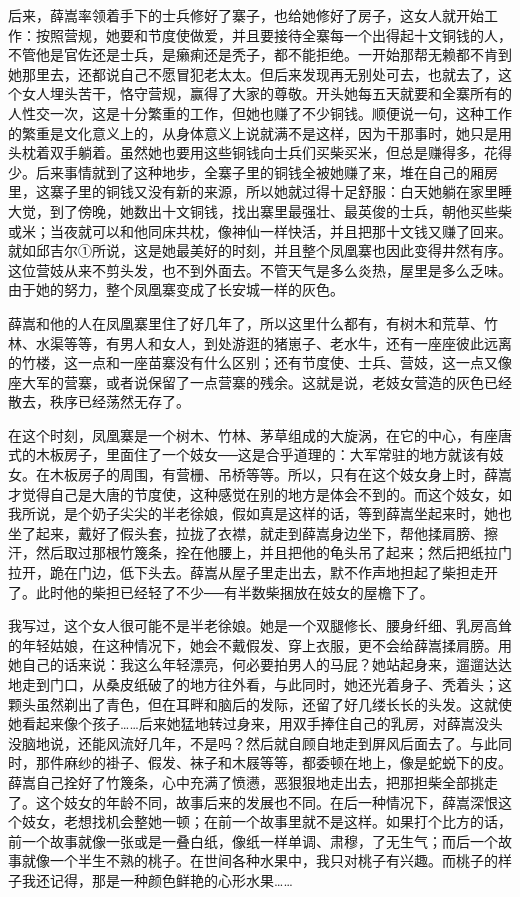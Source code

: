后来，薛嵩率领着手下的士兵修好了寨子，也给她修好了房子，这女人就开始工作：按照营规，她要和节度使做爱，并且要接待全寨每一个出得起十文铜钱的人，不管他是官佐还是士兵，是癞痢还是秃子，都不能拒绝。一开始那帮无赖都不肯到她那里去，还都说自己不愿冒犯老太太。但后来发现再无别处可去，也就去了，这个女人埋头苦干，恪守营规，赢得了大家的尊敬。开头她每五天就要和全寨所有的人性交一次，这是十分繁重的工作，但她也赚了不少铜钱。顺便说一句，这种工作的繁重是文化意义上的，从身体意义上说就满不是这样，因为干那事时，她只是用头枕着双手躺着。虽然她也要用这些铜钱向士兵们买柴买米，但总是赚得多，花得少。后来事情就到了这种地步，全寨子里的铜钱全被她赚了来，堆在自己的厢房里，这寨子里的铜钱又没有新的来源，所以她就过得十足舒服：白天她躺在家里睡大觉，到了傍晚，她数出十文铜钱，找出寨里最强壮、最英俊的士兵，朝他买些柴或米；当夜就可以和他同床共枕，像神仙一样快活，并且把那十文钱又赚了回来。就如邱吉尔①所说，这是她最美好的时刻，并且整个凤凰寨也因此变得井然有序。这位营妓从来不剪头发，也不到外面去。不管天气是多么炎热，屋里是多么乏味。由于她的努力，整个凤凰寨变成了长安城一样的灰色。 

薛嵩和他的人在凤凰寨里住了好几年了，所以这里什么都有，有树木和荒草、竹林、水渠等等，有男人和女人，到处游逛的猪崽子、老水牛，还有一座座彼此远离的竹楼，这一点和一座苗寨没有什么区别；还有节度使、士兵、营妓，这一点又像座大军的营寨，或者说保留了一点营寨的残余。这就是说，老妓女营造的灰色已经散去，秩序已经荡然无存了。 

在这个时刻，凤凰寨是一个树木、竹林、茅草组成的大旋涡，在它的中心，有座唐式的木板房子，里面住了一个妓女──这是合乎道理的：大军常驻的地方就该有妓女。在木板房子的周围，有营栅、吊桥等等。所以，只有在这个妓女身上时，薛嵩才觉得自己是大唐的节度使，这种感觉在别的地方是体会不到的。而这个妓女，如我所说，是个奶子尖尖的半老徐娘，假如真是这样的话，等到薛嵩坐起来时，她也坐了起来，戴好了假头套，拉拢了衣襟，就走到薛嵩身边坐下，帮他揉肩膀、擦汗，然后取过那根竹篾条，拴在他腰上，并且把他的龟头吊了起来；然后把纸拉门拉开，跪在门边，低下头去。薛嵩从屋子里走出去，默不作声地担起了柴担走开了。此时他的柴担已经轻了不少──有半数柴捆放在妓女的屋檐下了。 

我写过，这个女人很可能不是半老徐娘。她是一个双腿修长、腰身纤细、乳房高耸的年轻姑娘，在这种情况下，她会不戴假发、穿上衣服，更不会给薛嵩揉肩膀。用她自己的话来说：我这么年轻漂亮，何必要拍男人的马屁？她站起身来，遛遛达达地走到门口，从桑皮纸破了的地方往外看，与此同时，她还光着身子、秃着头；这颗头虽然剃出了青色，但在耳畔和脑后的发际，还留了好几缕长长的头发。这就使她看起来像个孩子……后来她猛地转过身来，用双手捧住自己的乳房，对薛嵩没头没脑地说，还能风流好几年，不是吗？然后就自顾自地走到屏风后面去了。与此同时，那件麻纱的褂子、假发、袜子和木屐等等，都委顿在地上，像是蛇蜕下的皮。薛嵩自己拴好了竹篾条，心中充满了愤懑，恶狠狠地走出去，把那担柴全部挑走了。这个妓女的年龄不同，故事后来的发展也不同。在后一种情况下，薛嵩深恨这个妓女，老想找机会整她一顿；在前一个故事里就不是这样。如果打个比方的话，前一个故事就像一张或是一叠白纸，像纸一样单调、肃穆，了无生气；而后一个故事就像一个半生不熟的桃子。在世间各种水果中，我只对桃子有兴趣。而桃子的样子我还记得，那是一种颜色鲜艳的心形水果…… 

